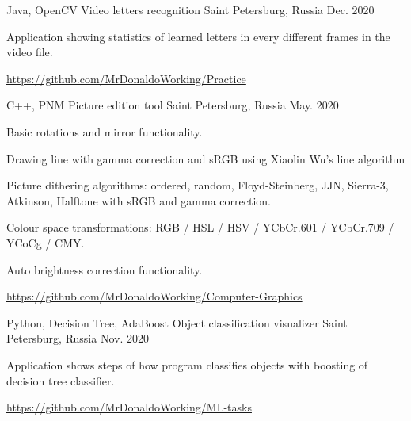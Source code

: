 \begin{cventries}
  \cventry
    {Java, OpenCV}%
    {Video letters recognition} %
    {Saint Petersburg, Russia} %
    {Dec. 2020} %
    {
      \begin{cvitems} %
        \item {Application showing statistics of learned letters in every different frames in the video file.}
        \item {\url {https://github.com/MrDonaldoWorking/Practice}}
      \end{cvitems}
    }

  \cventry
    {C++, PNM}%
    {Picture edition tool} %
    {Saint Petersburg, Russia} %
    {May. 2020} %
    {
      \begin{cvitems} %
        \item {Basic rotations and mirror functionality.}
        \item {Drawing line with gamma correction and sRGB using Xiaolin Wu's line algorithm}
        \item {Picture dithering algorithms: ordered, random, Floyd-Steinberg, JJN, Sierra-3, Atkinson, Halftone with sRGB and gamma correction.}
        \item {Colour space transformations: RGB / HSL / HSV / YCbCr.601 / YCbCr.709 / YCoCg / CMY.}
        \item {Auto brightness correction functionality.}
        \item {\url {https://github.com/MrDonaldoWorking/Computer-Graphics}}
      \end{cvitems}
    }
    
  \cventry
    {Python, Decision Tree, AdaBoost}%
    {Object classification visualizer} %
    {Saint Petersburg, Russia} %
    {Nov. 2020} %
    {
      \begin{cvitems} %
        \item {Application shows steps of how program classifies objects with boosting of decision tree classifier.}
        \item {\url {https://github.com/MrDonaldoWorking/ML-tasks}}
      \end{cvitems}
    }


\end{cventries}
